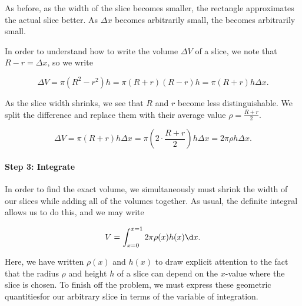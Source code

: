 \documentclass{ximera}
\begin{document}
\begin{model}
\begin{image}

            \end{image}
            
As before, as the width of the slice becomes smaller, the rectangle approximates the actual slice better.  As $\Delta x$ becomes arbitrarily small, the  becomes arbitrarily small.

In order to understand how to write the volume $\Delta V$ of a slice, we note that $R-r = \Delta x$, so we write

\[
\Delta V = \pi (R^2-r^2)h = \pi(R+r)(R-r)h = \pi(R+r)h \Delta x.
\] 

As the slice width shrinks, we see that $R$ and $r$ become less distinguishable.  We split the difference and replace them with their average value $\rho = \frac{R+r}{2}$.

\[
\Delta V = \pi (R+r)h \Delta x = \pi \left(2 \cdot \frac{R+r}{2} \right)h \Delta x  = 2\pi \rho h \Delta x.
\]        

\paragraph{Step 3: Integrate}
In order to find the exact volume, we simultaneously must shrink the width of our slices while adding all of the volumes together.  As usual, the definite integral allows us to do this, and we may write

\[
V= \int_{x=0}^{x=1} 2 \pi \rho(x) h(x) \d x .
\]    

Here, we have written $\rho(x)$ and $h(x)$ to draw explicit attention to the fact that the radius $\rho$ and height $h$ of a slice can depend  on the $x$-value where the slice is chosen. To finish off the problem, we must express these geometric quantitiesfor our arbitrary slice in terms of the variable of integration.


\end{model}
\end{document}
